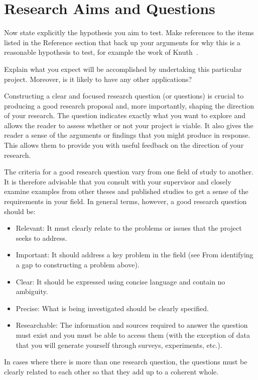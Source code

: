 \documentclass[12pt, a4paper]{article}
\begin{document}
\section{Research Aims and Questions}
Now state explicitly the hypothesis you aim to test. Make references to the items listed in the Reference section that back up your arguments for why this is a reasonable hypothesis to test, for example the work of Knuth~\cite{knuth}.

Explain what you expect will be accomplished by undertaking this particular project.  Moreover, is it likely to have any other applications?

Constructing a clear and focused research question (or questions) is crucial to producing a good research proposal and, more importantly, shaping the direction of your research. The question indicates exactly what you want to explore and allows the reader to assess whether or not your project is viable. It also gives the reader a sense of the arguments or findings that you might produce in response. This allows them to provide you with useful feedback on the direction of your research.

The criteria for a good research question vary from one field of study to another. It is therefore advisable that you consult with your supervisor and closely examine examples from other theses and published studies to get a sense of the requirements in your field. In general terms, however, a good research question should be:
\begin{itemize}
\item Relevant: It must clearly relate to the problems or issues that the project seeks to address.
\item Important: It should address a key problem in the field (see From identifying a gap to constructing a problem above).  
\item Clear: It should be expressed using concise language and contain no ambiguity.
\item Precise: What is being investigated should be clearly specified.
\item Researchable: The information and sources required to answer the question must exist and you must be able to access them (with the exception of data that you will generate yourself through surveys, experiments, etc.).
\end{itemize}

In cases where there is more than one research question, the questions must be clearly related to each other so that they add up to a coherent whole.
\end{document}
